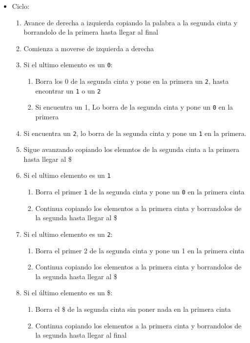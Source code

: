 \begin{itemize}
    \item Ciclo:
    \begin{enumerate}
        \item Avance de derecha a izquierda copiando la palabra a la segunda cinta y borrandolo de la primera hasta llegar al final
        \item Comienza a moverse de izquierda a derecha
        \item Si el ultimo elemento es un \texttt{0}:
        \begin{enumerate}[1.]
            \item Borra los 0 de la segunda cinta y pone en la primera un \texttt{2}, hasta encontrar un \texttt{1} o un \texttt{2}
            \item Si encuentra un 1, Lo borra de la segunda cinta y pone un \texttt{0} en la primera
        \end{enumerate}
        \item Si encuentra un \texttt{2}, lo borra de la segunda cinta y pone un \texttt{1} en la primera.
        \item Sigue avanzando copiando los elemntos de la segunda cinta a la primera hasta llegar al \$
        \item Si el ultimo elemento es un \texttt{1}
        \begin{enumerate}[1.]
            \item Borra el primer \texttt{1} de la segunda cinta y pone un \texttt{0} en la primera cinta
            \item Continua copiando los elementos a la primera cinta y borrandolos de la segunda hasta llegar al \$
        \end{enumerate}
        \item Si el ultimo elemento es un \texttt{2}:
        \begin{enumerate}[1.]
            \item Borra el primer 2 de la segunda cinta y pone un 1 en la primera cinta
            \item Continua copiando los elementos a la primera cinta y borrandolos de la segunda hasta llegar al \$
        \end{enumerate}
        \item Si el último elemento es un \$:
        \begin{enumerate}[1.]
            \item Borra el \$ de la segunda cinta sin poner nada en la primera cinta
            \item Continua copiando los elementos a la primera cinta y borrandolos de la segunda hasta llegar al final

\end{enumerate}
\end{enumerate}
\end{itemize}
